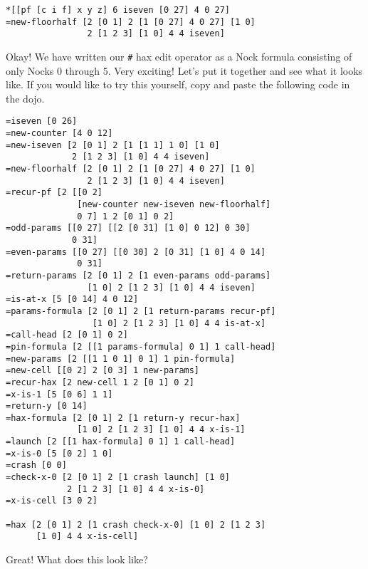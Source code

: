 \documentclass[twoside]{article}
\begin{document}
\begin{lstlisting}[style=listingblock]
*[[pf [c i f] x y z] 6 iseven [0 27] 4 0 27]
=new-floorhalf [2 [0 1] 2 [1 [0 27] 4 0 27] [1 0]
                2 [1 2 3] [1 0] 4 4 iseven]
\end{lstlisting}

\noindent
Okay! We have written our \lstinline[style=inlinecode]{#} hax edit operator as a Nock formula consisting of only Nocks 0 through 5. Very exciting! Let's put it together and see what it looks like. If you would like to try this yourself, copy and paste the following code in the dojo.

\begin{lstlisting}[style=listingcode]
=iseven [0 26]
=new-counter [4 0 12]
=new-iseven [2 [0 1] 2 [1 [1 1] 1 0] [1 0]
             2 [1 2 3] [1 0] 4 4 iseven]
=new-floorhalf [2 [0 1] 2 [1 [0 27] 4 0 27] [1 0]
                2 [1 2 3] [1 0] 4 4 iseven]
=recur-pf [2 [[0 2]
              [new-counter new-iseven new-floorhalf]
              0 7] 1 2 [0 1] 0 2] 
=odd-params [[0 27] [[2 [0 31] [1 0] 0 12] 0 30]
             0 31]
=even-params [[0 27] [[0 30] 2 [0 31] [1 0] 4 0 14]
              0 31]
=return-params [2 [0 1] 2 [1 even-params odd-params]
                [1 0] 2 [1 2 3] [1 0] 4 4 iseven]
=is-at-x [5 [0 14] 4 0 12]
=params-formula [2 [0 1] 2 [1 return-params recur-pf]
                 [1 0] 2 [1 2 3] [1 0] 4 4 is-at-x]
=call-head [2 [0 1] 0 2]
=pin-formula [2 [[1 params-formula] 0 1] 1 call-head]
=new-params [2 [[1 1 0 1] 0 1] 1 pin-formula]
=new-cell [[0 2] 2 [0 3] 1 new-params]
=recur-hax [2 new-cell 1 2 [0 1] 0 2]
=x-is-1 [5 [0 6] 1 1]
=return-y [0 14]
=hax-formula [2 [0 1] 2 [1 return-y recur-hax]
              [1 0] 2 [1 2 3] [1 0] 4 4 x-is-1]
=launch [2 [[1 hax-formula] 0 1] 1 call-head]
=x-is-0 [5 [0 2] 1 0]
=crash [0 0]
=check-x-0 [2 [0 1] 2 [1 crash launch] [1 0]
            2 [1 2 3] [1 0] 4 4 x-is-0]
=x-is-cell [3 0 2]

=hax [2 [0 1] 2 [1 crash check-x-0] [1 0] 2 [1 2 3]
      [1 0] 4 4 x-is-cell]
\end{lstlisting}

Great! What does this look like?
\end{document}
